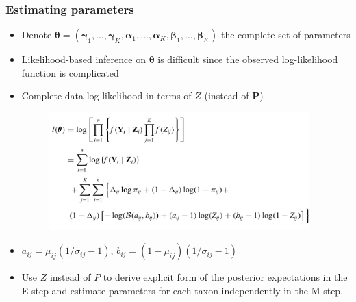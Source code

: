 \documentclass{beamer}
\begin{document}
\begin{frame}
\frametitle{Estimating parameters}
\begin{itemize}
  \item Denote $\boldsymbol\theta = (\boldsymbol\gamma_1, \ldots , \boldsymbol\gamma_K, \boldsymbol\alpha_1, \ldots , \boldsymbol\alpha_K, \boldsymbol\beta_1, \ldots , \boldsymbol\beta_K)$ the complete set of parameters
  \item Likelihood-based inference on $\boldsymbol\theta$ is difficult since the observed log-likelihood function is complicated
  \item Complete data log-likelihood in terms of $Z$ (instead of $\bm P$)
  \begin{figure}[!htb]
	\centering
	\includegraphics[width=0.95\textwidth]{img/2022.02.10_Zero_Inflated_generalized_Dirichlet_Multinomial-4c696321.png}
\end{figure}
\item $a_{ij} = \mu_{ij}(1/\sigma_{ij} - 1)$, $b_{ij} = (1 - \mu_{ij})(1/\sigma_{ij} - 1)$
\item Use $Z$ instead of $P$ to derive explicit form of the posterior expectations in the E-step and estimate parameters for each taxon independently in the M-step.
\end{itemize}
\end{frame}
\end{document}
